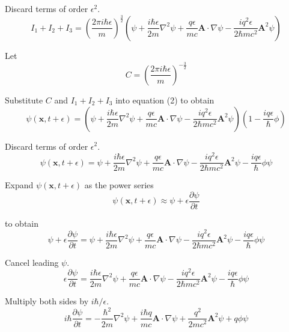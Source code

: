 Discard terms of order $\epsilon^2$.
\begin{equation*}
I_1+I_2+I_3=\left(\frac{2\pi i\hbar\epsilon}{m}\right)^\frac{3}{2}
\left(
\psi
+\frac{i\hbar\epsilon}{2m}\nabla^2\psi
+\frac{q\epsilon}{mc}\mathbf A\cdot\nabla\psi
-\frac{iq^2\epsilon}{2\hbar mc^2}\mathbf A^2\psi
\right)
\end{equation*}

Let
\begin{equation*}
C=\left(\frac{2\pi i\hbar\epsilon}{m}\right)^{-\frac{3}{2}}
\end{equation*}

Substitute $C$ and $I_1+I_2+I_3$ into equation (2) to obtain
\begin{equation*}
\psi(\mathbf x,t+\epsilon)
=\left(\psi
+\frac{i\hbar\epsilon}{2m}\nabla^2\psi
+\frac{q\epsilon}{mc}\mathbf A\cdot\nabla\psi
-\frac{iq^2\epsilon}{2\hbar mc^2}\mathbf A^2\psi
\right)
\left(1-\frac{iq\epsilon}{\hbar}\phi\right)
\end{equation*}

Discard terms of order $\epsilon^2$.
\begin{equation*}
\psi(\mathbf x,t+\epsilon)
=\psi
+\frac{i\hbar\epsilon}{2m}\nabla^2\psi
+\frac{q\epsilon}{mc}\mathbf A\cdot\nabla\psi
-\frac{iq^2\epsilon}{2\hbar mc^2}\mathbf A^2\psi
-\frac{iq\epsilon}{\hbar}\phi\psi
\end{equation*}

Expand $\psi(\mathbf x,t+\epsilon)$ as the power series
\begin{equation*}
\psi(\mathbf x,t+\epsilon)\approx\psi+\epsilon\frac{\partial\psi}{\partial t}
\end{equation*}

to obtain
\begin{equation*}
\psi+\epsilon\frac{\partial\psi}{\partial t}
=\psi
+\frac{i\hbar\epsilon}{2m}\nabla^2\psi
+\frac{q\epsilon}{mc}\mathbf A\cdot\nabla\psi
-\frac{iq^2\epsilon}{2\hbar mc^2}\mathbf A^2\psi
-\frac{iq\epsilon}{\hbar}\phi\psi
\end{equation*}

Cancel leading $\psi$.
\begin{equation*}
\epsilon\frac{\partial\psi}{\partial t}
=\frac{i\hbar\epsilon}{2m}\nabla^2\psi
+\frac{q\epsilon}{mc}\mathbf A\cdot\nabla\psi
-\frac{iq^2\epsilon}{2\hbar mc^2}\mathbf A^2\psi
-\frac{iq\epsilon}{\hbar}\phi\psi
\end{equation*}

Multiply both sides by $i\hbar/\epsilon$.
\begin{equation*}
i\hbar\frac{\partial\psi}{\partial t}
=-\frac{\hbar^2}{2m}\nabla^2\psi
+\frac{i\hbar q}{mc}\mathbf A\cdot\nabla\psi
+\frac{q^2}{2mc^2}\mathbf A^2\psi
+q\phi\psi
\end{equation*}

